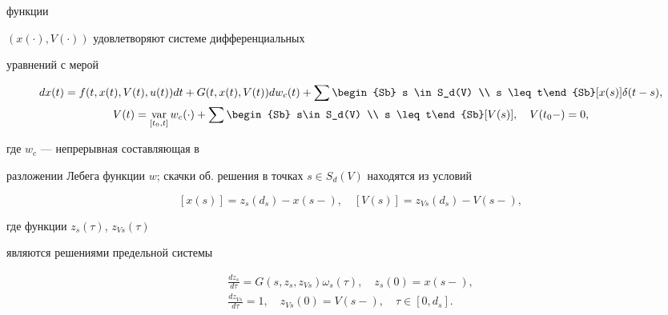 функции


$(x(\cdot),V(\cdot))$ удовлетворяют системе дифференциальных


уравнений с мерой


\begin{gather}


dx(t)=f(t,x(t),V(t),u(t))dt+G(t,x(t),V(t))d w_c(t)


+\sum\begin{Sb} s \in S_d(V) \\ s \leq t\end{Sb}


[x(s)]\delta(t-s),\label{eq:(5.4)} \\


V(t)=\var_{[t_0,t]}


w_c(\cdot)+ \sum\begin{Sb} s\in S_d(V) \\ s \leq t\end{Sb}[V(s)],\quad


V(t_0-)=0, \label{eq:(5.5)}


\end{gather}


где $ w_c$ --- непрерывная составляющая в


разложении Лебега функции $ w$; скачки об. решения в точках $s\in


S_d(V)$ находятся из условий


\begin{equation}


[x(s)]=z_s(d_s)-x(s-), \quad {[V(s)]} = z_{Vs}(d_s)-V(s-),


\label{eq:(5.6)}


\end{equation}


где функции $z_s(\tau)$, $z_{Vs}(\tau)$


являются решениями предельной системы


\begin{equation}


\begin{array}{c}


\displaystyle\frac{dz_s}{d\tau}=G(s,z_s,z_{Vs})\omega_s(\tau),


\quad z_s(0)=x(s-),\\[3mm]


\displaystyle\frac{dz_{Vs}}{d\tau}=1, \quad z_{Vs}(0)=V(s-), \quad


\tau\in [0,d_s].


\end{array}


\label{eq:(5.7)}


\end{equation}





